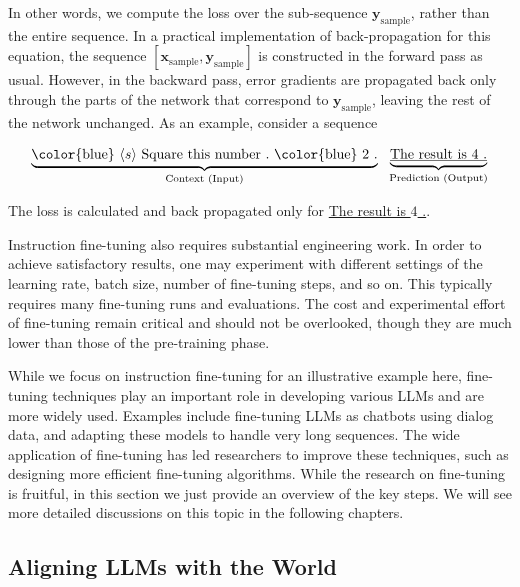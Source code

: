 \noindent In other words, we compute the loss over the sub-sequence $\mathbf{y}_{\mathrm{sample}}$, rather than the entire sequence. In a practical implementation of back-propagation for this equation, the sequence $[\mathbf{x}_{\mathrm{sample}},\mathbf{y}_{\mathrm{sample}}]$ is constructed in the forward pass as usual. However, in the backward pass, error gradients are propagated back only through the parts of the network that correspond to $\mathbf{y}_{\mathrm{sample}}$, leaving the rest of the network unchanged. As an example, consider a sequence

\begin{equation}
\underbrace{\textrm{{\color{blue} $\langle s \rangle$ Square this number .}}\ \textrm{{\color{blue} $2$ .}}}_{\textrm{Context (Input)}}\ \ \underbrace{\textrm{\underline{The result is $4$ .}}}_{\textrm{Prediction (Output)}}\nonumber
\end{equation}

\noindent The loss is calculated and back propagated only for \underline{The result is $4$ .}.

Instruction fine-tuning also requires substantial engineering work. In order to achieve satisfactory results, one may experiment with different settings of the learning rate, batch size, number of fine-tuning steps, and so on. This typically requires many fine-tuning runs and evaluations. The cost and experimental effort of fine-tuning remain critical and should not be overlooked, though they are much lower than those of the pre-training phase.

While we focus on instruction fine-tuning for an illustrative example here, fine-tuning techniques play an important role in developing various LLMs and are more widely used. Examples include fine-tuning LLMs as chatbots using dialog data, and adapting these models to handle very long sequences. The wide application of fine-tuning has led researchers to improve these techniques, such as designing more efficient fine-tuning algorithms. While the research on fine-tuning is fruitful, in this section we just provide an overview of the key steps. We will see more detailed discussions on this topic in the following chapters.

\subsection{Aligning LLMs with the World}

